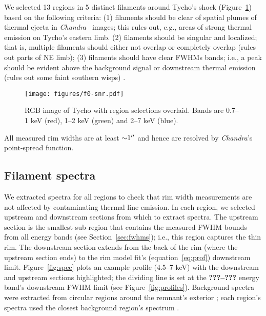 \documentclass[iop, apj, numberedappendix, twocolappendix]{emulateapj}
\newcommand*{\abt}{\mathord{\sim}} %
\newcommand*{\Chandra}{\textit{Chandra}\ }
\begin{document}
We selected 13 regions in 5 distinct filaments around Tycho's shock
(Figure~\ref{fig:snr}) based on the following criteria:
(1) filaments should be clear of spatial plumes of thermal ejecta in \Chandra
images; this rules out, e.g., areas of strong thermal emission on Tycho's eastern limb.
(2) filaments should be singular and localized; that is, multiple filaments
should either not overlap or completely overlap (rules out parts of NE limb);
(3) filaments should have clear FWHMs bands; i.e., a peak should be evident
above the background signal or downstream thermal emission (rules out some
faint southern wisps) .

\begin{figure}
    \centering
    \texttt{[image: figures/f0-snr.pdf]}
    \caption{RGB image of Tycho with region selections overlaid.  Bands are
    0.7--1 keV (red), 1--2 keV (green) and 2--7 keV (blue).
    }
    \label{fig:snr}
\end{figure}

All measured rim widths are at least $\abt 1\arcsec$ and hence are resolved by
\textit{Chandra}'s point-spread function.

\subsection{Filament spectra}
\label{sec:spec}

We extracted spectra for all regions to check that rim width measurements are
not affected by contaminating thermal line emission.  In each region, we
selected upstream and downstream sections  from which to extract spectra.
The upstream section is the smallest sub-region that contains the measured FWHM
bounds from all energy bands (see Section~\ref{sec:fwhms}); i.e., this region
captures the thin rim.
The downstream section extends from the back of the rim (where the upstream
section ends) to the rim model fit's
(equation~\eqref{eq:prof}) downstream limit.
Figure~\ref{fig:spec} plots an example profile (4.5--7 keV) with the
downstream and upstream sections highlighted; the dividing line is set at the
\textbf{???--???} energy band's downstream FWHM limit (see Figure~\ref{fig:profiles}).
Background spectra were extracted from circular regions around the remnant's
exterior ; each region's spectra used the
closest background region's spectrum .
\end{document}
